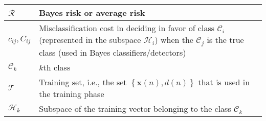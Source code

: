 \documentclass{article}
\begin{document}
\begin{xltabular}{\textwidth}{XX}
	\(\mathscr{R}\)                                                                                                                                                                & Bayes risk or average risk \cite{bishopPatternRecognitionMachine2006}                                                                                                                                                                                                                                                                  \\ \hline
	\(c_{ij}, C_{ij}\)                                                                                                                                                             & Misclassification cost in deciding in favor of class \(\mathscr{C}_i\) (represented in the subspace \(\mathscr{H}_i\)) when the \(\mathscr{C}_j\) is the true class (used in Bayes classifiers/detectors) \cite{bishopPatternRecognitionMachine2006,CharlesPES}                                                                        \\ \hline
	\(\mathscr{C}_k\)                                                                                                                                                              & \(k\)th class \cite{bishopPatternRecognitionMachine2006}                                                                                                                                                                                                                                                                               \\ \hline
	\(\mathscr{T}\)                                                                                                                                                                & Training set, i.e., the set \(\left\{ \mathbf{x}(n), d(n) \right\}\) that is used in the training phase \cite{bishopPatternRecognitionMachine2006}                                                                                                                                                                                     \\ \hline
	\(\mathscr{H}_k\)                                                                                                                                                              & Subspace of the training vector belonging to the class \(\mathscr{C}_k\)                                                                                                                                                                                                                                                               \\ \hline

\end{xltabular}
\end{document}
